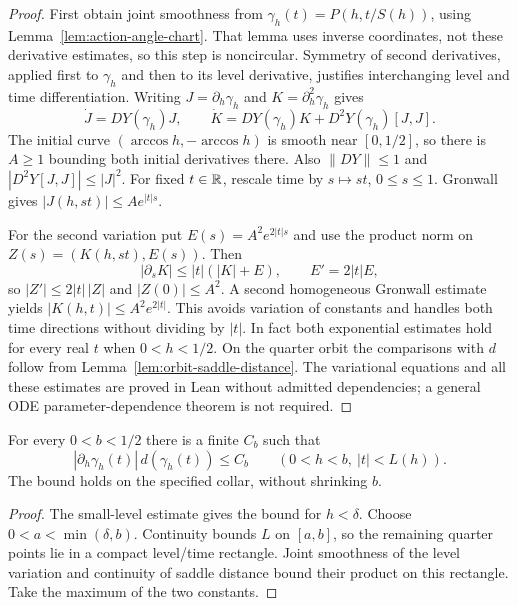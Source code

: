 \begin{proof}
\leanok
First obtain joint smoothness from
$\gamma_h(t)=P(h,t/S(h))$, using Lemma~\ref{lem:action-angle-chart}.
That lemma uses inverse coordinates, not these derivative estimates,
so this step is noncircular. Symmetry of second derivatives, applied
first to $\gamma_h$ and then to its level derivative, justifies
interchanging level and time differentiation. Writing
$J=\partial_h\gamma_h$ and $K=\partial_h^2\gamma_h$ gives
\[
  \dot J=DY(\gamma_h)J,\qquad
  \dot K=DY(\gamma_h)K+D^2Y(\gamma_h)[J,J].
\]
The initial curve $(\arccos h,-\arccos h)$ is smooth near $[0,1/2]$,
so there is $A\ge1$ bounding both initial derivatives there.
Also $\|DY\|\le1$ and $|D^2Y[J,J]|\le|J|^2$.
For fixed $t\in\mathbb{R}$, rescale time by $s\mapsto st$, $0\le s\le1$.
Gronwall gives $|J(h,st)|\le Ae^{|t|s}$.

For the second variation put $E(s)=A^2e^{2|t|s}$ and use the product
norm on $Z(s)=(K(h,st),E(s))$. Then
\[
  |\partial_s K|\le|t|(|K|+E),\qquad E'=2|t|E,
\]
so $|Z'|\le2|t|\,|Z|$ and $|Z(0)|\le A^2$.
A second homogeneous Gronwall estimate yields
$|K(h,t)|\le A^2e^{2|t|}$. This avoids variation of constants and
handles both time directions without dividing by $|t|$.
In fact both exponential estimates hold for every real $t$ when
$0<h<1/2$. On the quarter orbit the comparisons with $d$ follow from
Lemma~\ref{lem:orbit-saddle-distance}. The variational equations and
all these estimates are proved in Lean without admitted dependencies;
a general ODE parameter-dependence theorem is not required.
\end{proof}

\begin{lemma}
\label{lem:orbit-level-distance-collar}
\leanok
For every $0<b<1/2$ there is a finite $C_b$ such that
\[
 |\partial_h\gamma_h(t)|\,d(\gamma_h(t))\le C_b
 \qquad(0<h<b,\ |t|<L(h)).
\]
The bound holds on the specified collar, without shrinking $b$.
\end{lemma}

\begin{proof}
\leanok
The small-level estimate gives the bound for $h<\delta$.
Choose $0<a<\min(\delta,b)$. Continuity bounds $L$ on $[a,b]$, so the
remaining quarter points lie in a compact level/time rectangle.
Joint smoothness of the level variation and continuity of saddle distance
bound their product on this rectangle. Take the maximum of the two constants.
\end{proof}

